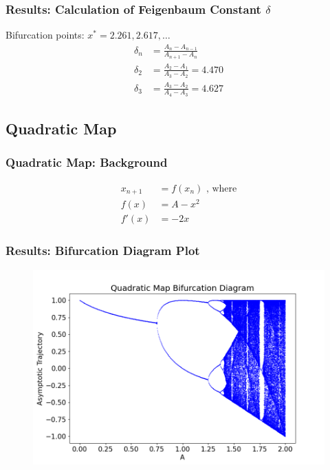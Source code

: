 \documentclass[
	11pt, %
	aspectratio=169, %
]{beamer}
\begin{document}

\begin{frame}
    \frametitle{Results: Calculation of Feigenbaum Constant $\delta$}
    Bifurcation points: $x^* = 2.261, 2.617, \dots$ \pause
    \begin{align*}
        \delta_{n} &= \frac{A_{n}-A_{n-1}}{A_{n+1}-A_{n}} \\
        \delta_{2} &= \frac{A_{2}-A_{1}}{A_{3}-A_{2}} = 4.470 \\
        \delta_{3} &= \frac{A_{3}-A_{2}}{A_{4}-A_{3}} = 4.627
    \end{align*}
\end{frame}


\subsection{Quadratic Map}

\begin{frame}
        \frametitle{Quadratic Map: Background}
        \begin{align*}
            x_{n+1} &= f(x_n) \text{ , where}\\
            f(x) &= A - x^2 \\
            f'(x) &= -2x
        \end{align*}
\end{frame}


\begin{frame}
        \frametitle{Results: Bifurcation Diagram Plot}
        \begin{figure}
            \includegraphics[width=0.6\linewidth]
            {quadratic_bifurcation_diagram.png}
        \end{figure}
\end{frame}
\end{document}

